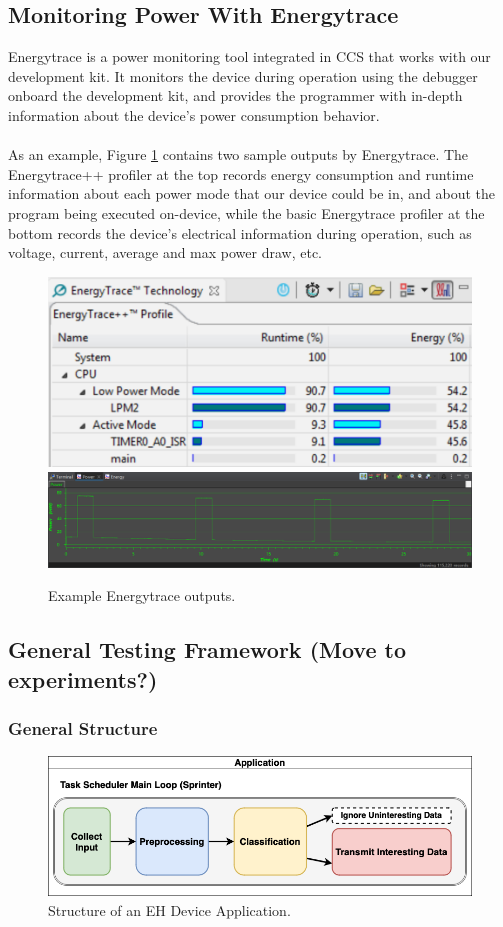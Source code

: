 \documentclass[twoside]{report}
\begin{document}
\subsection{Monitoring Power With Energytrace}
Energytrace is a power monitoring tool integrated in CCS that works with our development kit. 
It monitors the device during operation using the debugger onboard the development kit, 
and provides the programmer with in-depth information about the device's power consumption behavior.\\\\
As an example, Figure \ref{fig:traces} contains two sample outputs by Energytrace. 
The Energytrace++ profiler at the top records energy consumption and runtime information 
about each power mode that our device could be in, and about the program being executed on-device, 
while the basic Energytrace profiler at the bottom records the device's electrical information 
during operation, such as voltage, current, average and max power draw, etc.
\begin{figure}[ht]
    \centering
    \includegraphics[width=0.8\linewidth]{method/trace2.png}
    \includegraphics[width=0.8\linewidth]{method/trace.PNG}
    \caption{Example Energytrace outputs.}
    \label{fig:traces}
\end{figure}

\subsection{General Testing Framework (Move to experiments?)}
\subsubsection{General Structure}
\begin{figure}[ht]
    \centering
    \includegraphics[width=0.9\linewidth]{method/struct.png}
    \caption{Structure of an EH Device Application.}
    \label{fig:struct}
\end{figure}
\end{document}
